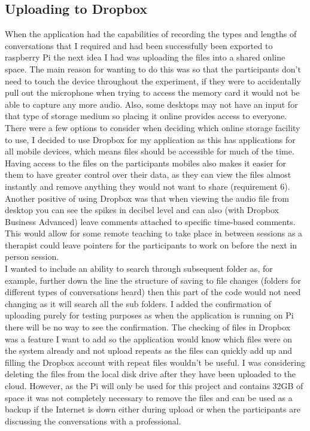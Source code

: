 \documentclass[a4paper,11pt]{report}
\begin{document}
\subsection{Uploading to Dropbox}
When the application had the capabilities of recording the types and lengths of conversations that I required and had been successfully been exported to raspberry Pi the next idea I had was uploading the files into a shared online space. The main reason for wanting to do this was so that the participants don’t need to touch the device throughout the experiment, if they were to accidentally pull out the microphone when trying to access the memory card it would not be able to capture any more audio. Also, some desktops may not have an input for that type of storage medium so placing it online provides access to everyone. There were a few options to consider  when deciding which online storage facility to use, I decided to use Dropbox for my application as this has applications for all mobile devices, which means files should be accessible for much of the time. Having access to the files on the participants mobiles also makes it easier for them to have greater control over their data, as they can view the files almost instantly and remove anything they would not want to share (requirement 6). Another positive of using Dropbox was that when viewing the audio file from desktop you can see the spikes in decibel level and can also (with Dropbox Business Advanced) leave comments attached to specific time-based comments. This would allow for some remote teaching to take place in between sessions as a therapist could leave pointers for the participants to work on before the next in person session.\\

I wanted to include an ability to search through subsequent folder as, for example, further down the line the structure of saving to file changes (folders for different types of conversations heard) then this part of the code would not need changing as it will search all the sub folders. I added the confirmation of uploading purely for testing purposes as when the application is running on Pi there will be no way to see the confirmation. The checking of files in Dropbox was a feature I want to add so the application would know which files were on the system already and not upload repeats as the files can quickly add up and filling the Dropbox account with repeat files wouldn’t be useful. I was considering deleting the files from the local disk drive after they have been uploaded to the cloud. However, as the Pi will only be used for this project and contains 32GB of space it was not completely necessary to remove the files and can be used as a backup if the Internet is down either during upload or when the participants are discussing the conversations with a professional.\\
\end{document}
